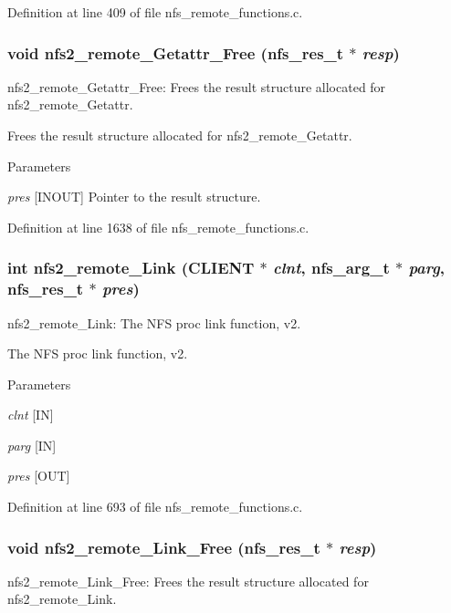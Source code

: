 Definition at line 409 of file nfs\_\-remote\_\-functions.c.
\subsubsection[{nfs2\_\-remote\_\-Getattr\_\-Free}]{\setlength{\rightskip}{0pt plus 5cm}void nfs2\_\-remote\_\-Getattr\_\-Free (nfs\_\-res\_\-t $\ast$ {\em resp})}\label{group__NFSprocs_gaaa5cabdd9a1a35185a2cd1e1e21bf177}
nfs2\_\-remote\_\-Getattr\_\-Free: Frees the result structure allocated for nfs2\_\-remote\_\-Getattr.

Frees the result structure allocated for nfs2\_\-remote\_\-Getattr.


\begin{DoxyParams}{Parameters}
\item[{\em pres}][INOUT] Pointer to the result structure. \end{DoxyParams}


Definition at line 1638 of file nfs\_\-remote\_\-functions.c.
\subsubsection[{nfs2\_\-remote\_\-Link}]{\setlength{\rightskip}{0pt plus 5cm}int nfs2\_\-remote\_\-Link (CLIENT $\ast$ {\em clnt}, \/  nfs\_\-arg\_\-t $\ast$ {\em parg}, \/  nfs\_\-res\_\-t $\ast$ {\em pres})}\label{group__NFSprocs_ga3ab0ff45754d77b4f491663c61ffd6cb}
nfs2\_\-remote\_\-Link: The NFS proc link function, v2.

The NFS proc link function, v2.


\begin{DoxyParams}{Parameters}
\item[{\em clnt}][IN] \item[{\em parg}][IN] \item[{\em pres}][OUT] \end{DoxyParams}


Definition at line 693 of file nfs\_\-remote\_\-functions.c.
\subsubsection[{nfs2\_\-remote\_\-Link\_\-Free}]{\setlength{\rightskip}{0pt plus 5cm}void nfs2\_\-remote\_\-Link\_\-Free (nfs\_\-res\_\-t $\ast$ {\em resp})}\label{group__NFSprocs_ga0f3806f9da2e535d33a6b3624597df16}
nfs2\_\-remote\_\-Link\_\-Free: Frees the result structure allocated for nfs2\_\-remote\_\-Link.

